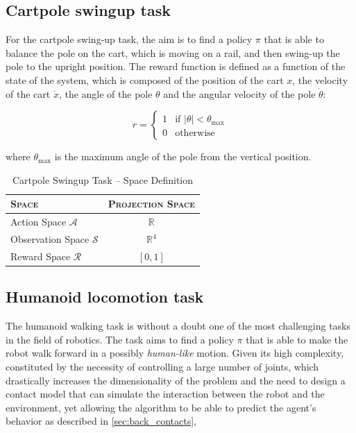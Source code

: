 \subsection{Cartpole swingup task}
For the cartpole swing-up task, the aim is to find a policy $\pi$ that is able to balance the pole on the cart, which is moving on a rail, and then swing-up the pole to the upright position. The reward function is defined as a function of the state of the system, which is composed of the position of the cart $x$, the velocity of the cart $\dot{x}$, the angle of the pole $\theta$ and the angular velocity of the pole $\dot{\theta}$:

\begin{equation}
    r = \begin{cases}
        1 & \text{if } \left| \theta \right| < \theta_{\text{max}} \\
        0 & \text{otherwise}
    \end{cases}
\end{equation}

where $\theta_{\text{max}}$ is the maximum angle of the pole from the vertical position.

\begin{table}
    \centering
    \label{tab:cartpoleswinguptaskspacedef}
    \begin{tabular}{l c}
        \toprule
        \textsc{Space}                  & \textsc{Projection Space} \\
        \midrule
        Action Space $\mathcal{A}$      & $\mathbb{R}$              \\
        Observation Space $\mathcal{S}$ & $\mathbb{R} ^{4}$         \\
        Reward Space $\mathcal{R}$      & $[0,1]$                   \\
        \bottomrule
    \end{tabular}
    \caption{Cartpole Swingup Task -- Space Definition}
\end{table}


\subsection{Humanoid locomotion task}
The humanoid walking task is without a doubt one of the most challenging tasks in the field of robotics. The task aims to find a policy $\pi$ that is able to make the robot walk forward in a possibly \textit{human-like} motion. Given its high complexity, constituted by the necessity of controlling a large number of joints, which drastically increases the dimensionality of the problem and the need to design a contact model that can simulate the interaction between the robot and the environment, yet allowing the algorithm to be able to predict the agent's behavior as described in \cref{sec:back_contacts},

